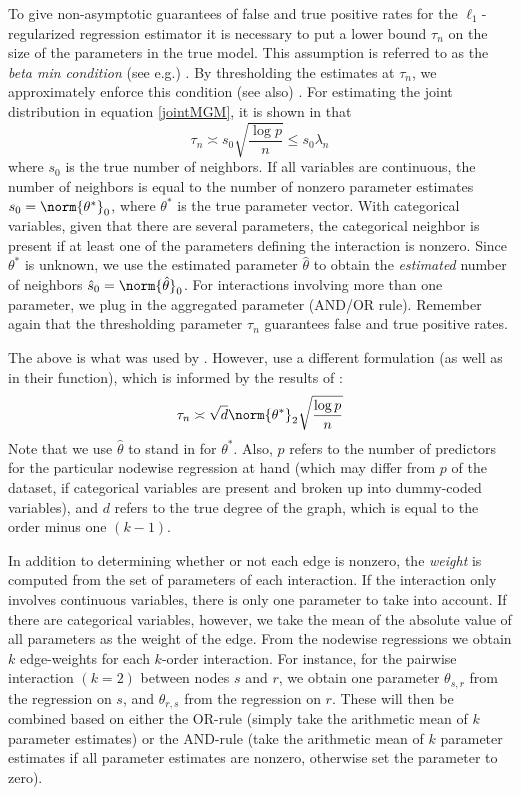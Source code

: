 To give non-asymptotic guarantees of false and true positive rates for the $\ell_1$-regularized regression estimator it is necessary to put a lower bound $\tau_n$ on the size of the parameters in the true model. This assumption is referred to as the \textit{beta min condition} (see e.g.) \cite{hastie2015statistical}. By thresholding the estimates at $\tau_n$, we approximately enforce this condition (see also) \cite{loh2013structure}. For estimating the joint distribution in equation \ref{jointMGM}, it is shown in \cite{haslbeck2017structure} that 
\begin{equation} \label{threshHW}
    \tau_n \asymp s_0 \sqrt{\frac{\log p}{n}} \leq s_0 \lambda_n
\end{equation}
where $s_0$ is the true number of neighbors. If all variables are continuous, the number of neighbors is equal to the number of nonzero parameter estimates $s_0 = \norm{\theta^{*}}_0$, where $\theta^{*}$ is the true parameter vector. With categorical variables, given that there are several parameters, the categorical neighbor is present if at least one of the parameters defining the interaction is nonzero. Since $\theta^{*}$ is unknown, we use the estimated parameter $\hat{\theta}$ to obtain the \textit{estimated} number of neighbors $\hat{s}_0 = \norm{\hat{\theta}}_0$. For interactions involving more than one parameter, we plug in the aggregated parameter (AND/OR rule). Remember again that the thresholding parameter $\tau_n$ guarantees false and true positive rates.

The above is what was used by \cite{haslbeck2015mgm}. However, \cite{haslbeck2017structure} use a different formulation (as well as in their  function), which is informed by the results of \cite{loh2013structure}:
\begin{equation} \label{threshLW}
    \tau_n \asymp \sqrt{d} \norm{\theta^*}_2 \sqrt{\frac{\log p}{n}}
\end{equation}
Note that we use $\hat{\theta}$ to stand in for $\theta^*$. Also, $p$ refers to the number of predictors for the particular nodewise regression at hand (which may differ from $p$ of the dataset, if categorical variables are present and broken up into dummy-coded variables), and $d$ refers to the true degree of the graph, which is equal to the order minus one $(k-1)$.

In addition to determining whether or not each edge is nonzero, the \textit{weight} is computed from the set of parameters of each interaction. If the interaction only involves continuous variables, there is only one parameter to take into account. If there are categorical variables, however, we take the mean of the absolute value of all parameters as the weight of the edge. From the nodewise regressions we obtain $k$ edge-weights for each $k$-order interaction. For instance, for the pairwise interaction $(k=2)$ between nodes $s$ and $r$, we obtain one parameter $\theta_{s,r}$ from the regression on $s$, and $\theta_{r,s}$ from the regression on $r$. These will then be combined based on either the OR-rule (simply take the arithmetic mean of $k$ parameter estimates) or the AND-rule (take the arithmetic mean of $k$ parameter estimates if all parameter estimates are nonzero, otherwise set the parameter to zero). 

